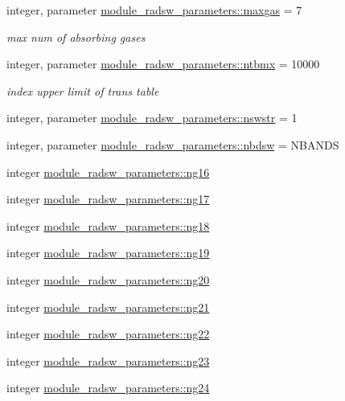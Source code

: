 \begin{DoxyCompactItemize}
integer, parameter \hyperlink{group__module__radsw__main_ga5bc6fbb4231281a604352eec6b8e2bfc}{module\+\_\+radsw\+\_\+parameters\+::maxgas} = 7
\begin{DoxyCompactList}\small\item\em max num of absorbing gases \end{DoxyCompactList}\item 
integer, parameter \hyperlink{group__module__radsw__main_ga4bd72558be40bfccfb78c48e640acd07}{module\+\_\+radsw\+\_\+parameters\+::ntbmx} = 10000
\begin{DoxyCompactList}\small\item\em index upper limit of trans table \end{DoxyCompactList}\item 
integer, parameter \hyperlink{group__module__radsw__main_ga3d4238ce9a40d70a6cdfe241d640ff5f}{module\+\_\+radsw\+\_\+parameters\+::nswstr} = 1
\item 
integer, parameter \hyperlink{group__module__radsw__main_gab1e121fde29dde00871e4a7d43be1ddb}{module\+\_\+radsw\+\_\+parameters\+::nbdsw} = N\+B\+A\+N\+DS
\item 
integer \hyperlink{group__module__radsw__main_ga442b3758f00a388cd8b7129ba910942a}{module\+\_\+radsw\+\_\+parameters\+::ng16}
\item 
integer \hyperlink{group__module__radsw__main_gaf1f90ffe5780463d1e2edbe0e8dfd1f9}{module\+\_\+radsw\+\_\+parameters\+::ng17}
\item 
integer \hyperlink{group__module__radsw__main_gac00a8e59e4f7e584af9b453c2c9fe35d}{module\+\_\+radsw\+\_\+parameters\+::ng18}
\item 
integer \hyperlink{group__module__radsw__main_gab3551e23105cd3515e887e877407dc39}{module\+\_\+radsw\+\_\+parameters\+::ng19}
\item 
integer \hyperlink{group__module__radsw__main_ga1619a2243f1cb29e4393598fa0bc4c8f}{module\+\_\+radsw\+\_\+parameters\+::ng20}
\item 
integer \hyperlink{group__module__radsw__main_gab029caf0ee0c1195539643bef00e0598}{module\+\_\+radsw\+\_\+parameters\+::ng21}
\item 
integer \hyperlink{group__module__radsw__main_ga655c1f742fc97d58c32131e8a85cb6fd}{module\+\_\+radsw\+\_\+parameters\+::ng22}
\item 
integer \hyperlink{group__module__radsw__main_ga0c4f1d2f9438850994bcedb395d07f40}{module\+\_\+radsw\+\_\+parameters\+::ng23}
\item 
integer \hyperlink{group__module__radsw__main_gae25ce9a47816b83c6c57440747f1975f}{module\+\_\+radsw\+\_\+parameters\+::ng24}

\end{DoxyCompactItemize}
